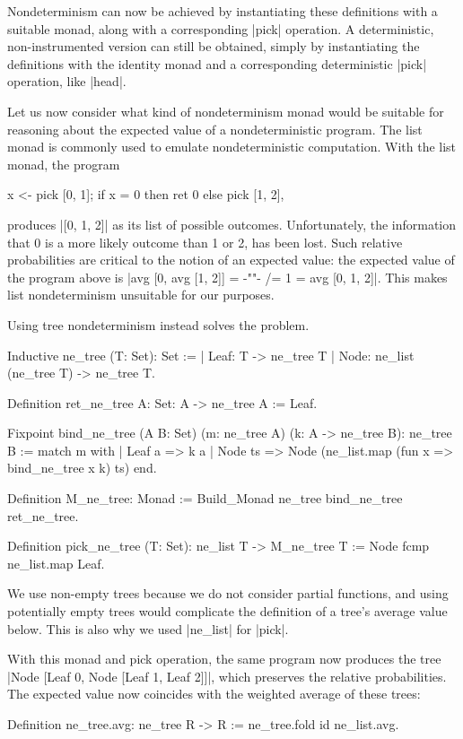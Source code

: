 \documentclass[runningheads]{llncs}
\begin{document}
Nondeterminism can now be achieved by instantiating these definitions with a suitable monad, along with a corresponding |pick| operation. A deterministic, non-instrumented version can still be obtained, simply by instantiating the definitions with the identity monad and a corresponding deterministic |pick| operation, like |head|.

Let us now consider what kind of nondeterminism monad would be suitable for reasoning about the expected value of a nondeterministic program. The list monad is commonly used to emulate nondeterministic computation. With the list monad, the program
\begin{code}
  x <- pick [0, 1]; if x = 0 then ret 0 else pick [1, 2],
\end{code}
produces |[0, 1, 2]| as its list of possible outcomes. Unfortunately, the information that 0 is a more likely outcome than 1 or 2, has been lost. Such relative probabilities are critical to the notion of an expected value: the expected value of the program above is |avg [0, avg [1, 2]] = {-""-} /= 1 = avg [0, 1, 2]|. This makes list nondeterminism unsuitable for our purposes.

Using tree nondeterminism instead solves the problem.
\begin{code}
  Inductive ne_tree (T: Set): Set :=
    | Leaf: T -> ne_tree T
    | Node: ne_list (ne_tree T) -> ne_tree T.

  Definition ret_ne_tree {A: Set}: A -> ne_tree A := Leaf.

  Fixpoint bind_ne_tree (A B: Set) (m: ne_tree A) (k: A -> ne_tree B): ne_tree B :=
    match m with
    | Leaf a => k a
    | Node ts => Node (ne_list.map (fun x => bind_ne_tree x k) ts)
    end.

  Definition M_ne_tree: Monad := Build_Monad ne_tree bind_ne_tree ret_ne_tree.

  Definition pick_ne_tree (T: Set): ne_list T -> M_ne_tree T
    := Node fcmp ne_list.map Leaf.
\end{code}
We use non-empty trees because we do not consider partial functions, and using potentially empty trees would complicate the definition of a tree's average value below. This is also why we used |ne_list| for |pick|.

With this monad and pick operation, the same program now produces the tree |Node [Leaf 0, Node [Leaf 1, Leaf 2]]|, which preserves the relative probabilities. The expected value now coincides with the weighted average of these trees:
\begin{code}
  Definition ne_tree.avg: ne_tree R -> R := ne_tree.fold id ne_list.avg.
\end{code}
\end{document}

